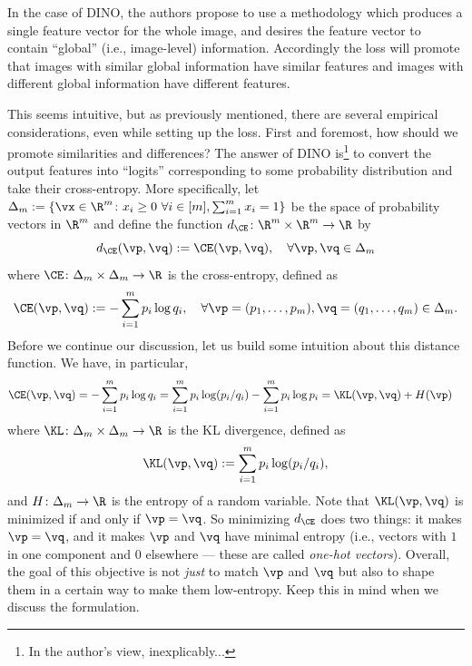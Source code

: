 \documentclass[../../book-main.tex]{subfiles}
\begin{document}
In the case of DINO, the authors propose to use a methodology which produces a single feature vector for the whole image, and desires the feature vector to contain ``global'' (i.e., image-level) information. Accordingly the loss will promote that images with similar global information have similar features and images with different global information have different features.

This seems intuitive, but as previously mentioned, there are several empirical considerations, even while setting up the loss. First and foremost, how should we promote similarities and differences? The answer of DINO \citep{caron2021emerging} is\footnote{In the author's view, inexplicably...} to convert the output features into ``logits'' corresponding to some probability distribution and take their cross-entropy. More specifically, let \(\Delta_{m} := \{\vx \in \R^{m} \colon x_{i} \geq 0\ \forall i \in [m], \sum_{i = 1}^{m}x_{i} = 1\}\) be the space of probability vectors in \(\R^{m}\) and define the function \(d_{\CE} \colon \R^{m} \times \R^{m} \to \R\) by
 \begin{equation}\label{eq:cross_entropy_difference}
    d_{\CE}(\vp, \vq) := \CE(\vp, \vq), \quad \forall \vp, \vq \in \Delta_{m}
 \end{equation}
 where \(\CE \colon \Delta_{m} \times \Delta_{m} \to \R\) is the cross-entropy, defined as 
 \begin{equation}\label{eq:expts_def_ce}
    \CE(\vp, \vq) := -\sum_{i = 1}^{m}p_{i}\log q_{i}, \quad \forall \vp = (p_{1}, \dots, p_{m}), \vq = (q_{1}, \dots, q_{m}) \in \Delta_{m}.
 \end{equation}
 Before we continue our discussion, let us build some intuition about this distance function. We have, in particular,
 \begin{align}
    \CE(\vp, \vq)
    &= -\sum_{i = 1}^{m}p_{i}\log q_{i} = \sum_{i = 1}^{m}p_{i}\log(p_{i}/q_{i}) - \sum_{i = 1}^{m}p_{i}\log p_{i} = \KL(\vp, \vq) + H(\vp)
 \end{align}
 where \(\KL \colon \Delta_{m} \times \Delta_{m} \to \R\) is the KL divergence, defined as 
 \begin{equation}
    \KL(\vp, \vq) := \sum_{i = 1}^{m}p_{i}\log(p_{i}/q_{i}),
 \end{equation}
 and \(H \colon \Delta_{m} \to \R\) is the entropy of a random variable. Note that \(\KL(\vp, \vq)\) is minimized if and only if \(\vp = \vq\). So minimizing \(d_{\CE}\) does two things: it makes \(\vp = \vq\), and it makes \(\vp\) and \(\vq\) have minimal entropy (i.e., vectors with \(1\) in one component and \(0\) elsewhere --- these are called \textit{one-hot vectors}). Overall, the goal of this objective is not \textit{just} to match \(\vp\) and \(\vq\) but also to shape them in a certain way to make them low-entropy. Keep this in mind when we discuss the formulation.
\end{document}
